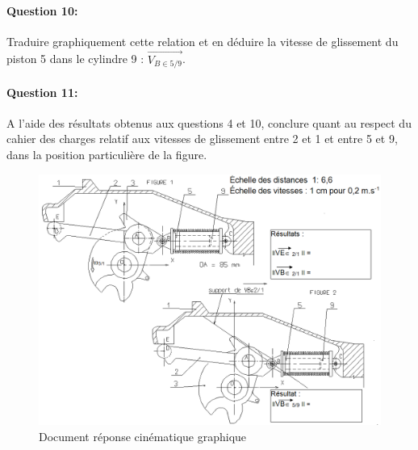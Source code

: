 \paragraph{Question 10:}

Traduire graphiquement cette relation et en déduire la vitesse de glissement du piston 5 dans le cylindre 9 : $\overrightarrow{V_{B \in 5/9}}$.

\paragraph{Question 11:}

A l'aide des résultats obtenus aux questions 4 et 10, conclure quant au respect du cahier des charges relatif aux vitesses de glissement entre 2 et 1 et entre 5 et 9, dans la position particulière de la figure.

%

\begin{figure}[!h]
\centering\includegraphics[width=1.2\linewidth,angle=90]{img/cin_graph.png}
 \caption{Document réponse cinématique graphique}
 \label{img:image105}
\end{figure}

